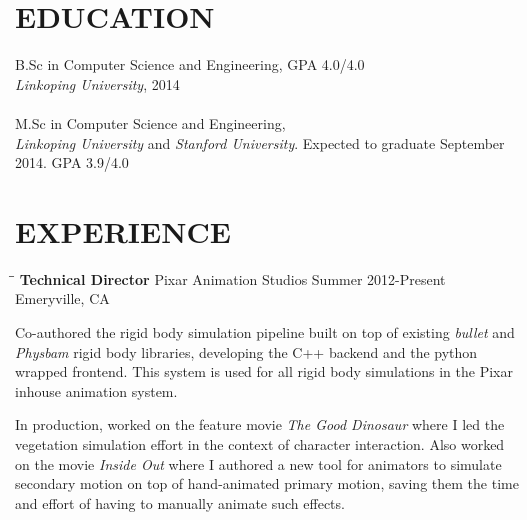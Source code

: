\documentclass{res}
\begin{document}
 


\address{\bf  PRESENT ADDRESS\\995 36th St\\Emeryville, CA 94608\\+1 650 283-7222}
\address{\bf PERMANENT ADDRESS \\ Bonared Vastergarden 6 \\51198 Hyssna, Sweden \\ +46 320 39261}

\begin{resume}      

\section{EDUCATION}
    B.Sc in Computer Science and Engineering, GPA 4.0/4.0\\ \emph{Linkoping University}, 2014 \\  \\
    M.Sc in Computer Science and Engineering, \\ \emph{Linkoping University} and \emph{Stanford University}. Expected to graduate September 2014. GPA 3.9/4.0
 
\section{EXPERIENCE}
   \vspace{-0.1in}	
   \begin{tabbing}
   \hspace{2.3in}\= \hspace{2.4in}\= \kill %
    {\bf Technical Director} \>Pixar Animation Studios     \>Summer 2012-Present\\
                             \>Emeryville, CA
   \end{tabbing}\vspace{-20pt}      %
    Co-authored the rigid body simulation pipeline built on top of existing \emph{bullet} and \emph{Physbam} rigid body libraries, developing the C++ backend and the python wrapped frontend. This system is used for all rigid body simulations in the Pixar inhouse animation system.

   In production, worked on the feature movie \emph{The Good Dinosaur} where I led the vegetation simulation effort in the context of character interaction. Also worked on the movie \emph{Inside Out} where I authored a new tool for animators to simulate secondary motion on top of hand-animated primary motion, saving them the time and effort of having to manually animate such effects.


\end{resume}
\end{document}
